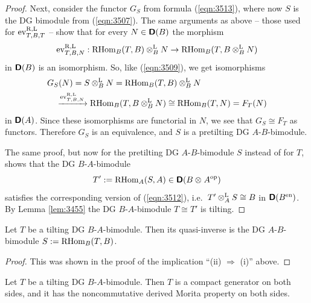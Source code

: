 \begin{proof}
Next, consider the functor $G_S$ from formula (\ref{eqn:3513}), where now $S$ 
is the DG bimodule from (\ref{eqn:3507}). The same arguments as above -- those 
used for $\operatorname{ev}^{\mathrm{R, L}}_{T, B, T}$ -- show that for every 
$N \in \boldsymbol{\mathsf{D}}(B)$ the morphism 
\[ \operatorname{ev}^{\mathrm{R, L}}_{T, B, N} : \operatorname{RHom}_B(T, B) \otimes^{\mathrm{L}}_{B} N \to 
\operatorname{RHom}_B(T, B \otimes^{\mathrm{L}}_{B} N) \]
in $\boldsymbol{\mathsf{D}}(B)$ is an isomorphism. So, like (\ref{eqn:3509}), we get 
isomorphisms 
\begin{equation} \label{eqn:3514}
\begin{aligned}
& G_S(N) = S \otimes^{\mathrm{L}}_{B} N = \operatorname{RHom}_B(T, B) \otimes^{\mathrm{L}}_{B} N
\\
& \quad \xrightarrow{\operatorname{ev}^{\mathrm{R, L}}_{T, B, N}}  
\operatorname{RHom}_B(T, B \otimes^{\mathrm{L}}_{B} N)
\cong \operatorname{RHom}_B(T, N) = F_T(N)
\end{aligned}
\end{equation}
in $\boldsymbol{\mathsf{D}}(A)$. Since these isomorphisms are functorial in $N$, we see that 
$G_S \cong F_T$ as functors. Therefore $G_S$ is an equivalence, and 
$S$ is a pretilting DG $A$-$B$-bimodule.

The same proof, but now for the pretilting DG $A$-$B$-bimodule $S$ instead of 
for $T$, shows that the DG $B$-$A$-bimodule 
\begin{equation} \label{eqn:3527}
T' := \operatorname{RHom}_A(S, A) \in \boldsymbol{\mathsf{D}}(B \otimes_{} A^{\mathrm{op}}) 
\end{equation}
satisfies the corresponding version of (\ref{eqn:3512}), i.e.\ 
$T' \otimes^{\mathrm{L}}_{A} S \cong B$
in $\boldsymbol{\mathsf{D}}(B^{\mathrm{en}})$. 
By Lemma \ref{lem:3455} the DG $B$-$A$-bimodule $T \cong T'$ is tilting.
\end{proof}

\begin{cor} \label{cor:3455}
Let $T$ be a tilting DG $B$-$A$-bimodule. Then its quasi-inverse is the DG 
$A$-$B$-bimodule $S := \operatorname{RHom}_B(T, B)$.
\end{cor}

\begin{proof}
This was shown in the proof of the implication ``(ii) $\Rightarrow$ (i)''
above.
\end{proof}

\begin{cor} \label{cor:3505}
Let $T$ be a tilting DG $B$-$A$-bimodule. Then $T$ is a compact generator on 
both sides, and it has the noncommutative derived Morita property on both 
sides.
\end{cor}

